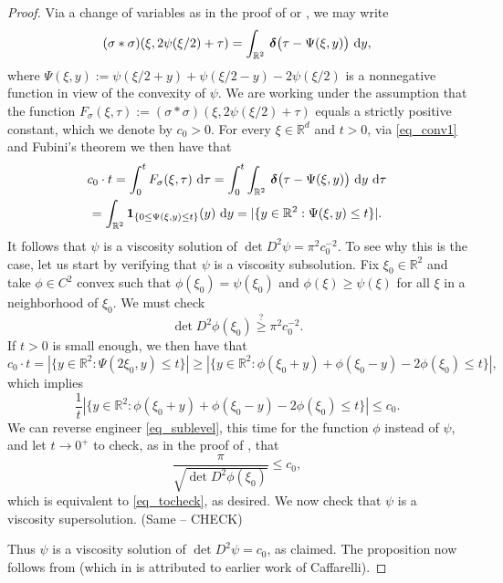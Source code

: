 \documentclass[11pt]{amsart}
\newcommand{\pvector}[1]{
  \begin{pmatrix}
    #1
  \end{pmatrix}}
\newcommand{\ddirac}[1]{
  \,\boldsymbol{\delta}\!\pvector{#1}\!}
\renewcommand{\d}{\,{\rm d}}
\def\R{\mathbb{R}}
\begin{document}
\begin{proof}
Via a change of variables as in the proof of \cite[Prop. 2.1.(c)]{OSQ18} or \cite[Prop. 2.1.(c)]{OSQ20}, we may write
\begin{equation}\label{eq_conv1}
    (\sigma\ast\sigma)(\xi,2\psi(\xi/2)+\tau)=\int_{\R^2}\ddirac{\tau-\Psi(\xi,y)}\,\d y,
\end{equation}
    where $\Psi(\xi,y):=\psi(\xi/2+y)+\psi(\xi/2-y)-2\psi(\xi/2)$ is a nonnegative function in view of the convexity of $\psi$.
    We are working under the assumption that the function $F_\sigma(\xi,\tau):=(\sigma\ast\sigma)(\xi,2\psi(\xi/2)+\tau)$ equals a strictly positive constant, which we denote by $c_0>0$. For every $\xi\in\R^d$ and $t>0$, via \eqref{eq_conv1} and Fubini's theorem we then have that
    \begin{multline}\label{eq_sublevel}
        c_0\cdot t
    =\int_0^t F_\sigma(\xi,\tau)\,\d\tau
    =\int_0^t \int_{\R^2}\ddirac{\tau-\Psi(\xi,y)}\,\d y\,\d\tau\\
    =\int_{\R^2} {\bf 1}_{\{0\leq\Psi(\xi,y)\leq t\}} (y)\,\d y=|\{y\in\R^2: \Psi(\xi,y)\leq t\}|.
    \end{multline}
    It follows that $\psi$ is a viscosity solution of $\det D^2\psi=\pi^2c_0^{-2}$.
    To see why this is the case, let us start by verifying that $\psi$ is a viscosity subsolution. 
    Fix $\xi_0\in\R^2$ and take $\phi\in C^2$ convex such that $\phi(\xi_0)=\psi(\xi_0)$ and $\phi(\xi)\geq\psi(\xi)$ for all $\xi$ in a neighborhood of $\xi_0$. 
    We must check  
    \begin{equation}\label{eq_tocheck}
        \det D^2\phi(\xi_0)\stackrel{?}{\geq} \pi^2c_0^{-2}.
    \end{equation}
    If $t>0$ is small enough, we then have that
    \[c_0\cdot t=|\{y\in\R^2: \Psi(2\xi_0,y)\leq t\}| \geq 
    |\{y\in\R^2:\phi(\xi_0+y)+\phi(\xi_0-y)-2\phi(\xi_0)\leq t\}|,\]
    which implies 
    \begin{equation}\label{eq_sublevel}
        \frac1t |\{y\in\R^2:\phi(\xi_0+y)+\phi(\xi_0-y)-2\phi(\xi_0)\leq t\}|\leq c_0.
    \end{equation}
    We can reverse engineer \eqref{eq_sublevel}, this time for the function $\phi$ instead of $\psi$, and let  $t\to 0^+$ to check, as in the proof of \cite[Prop.\@ 2.1(d)]{OSQ18},
    that
    \[\frac{\pi}{\sqrt{\det D^2\phi(\xi_0)}}\leq c_0,\]
 which is equivalent to \eqref{eq_tocheck}, as desired.
    We now check that $\psi$ is a viscosity supersolution. (Same -- CHECK)

    Thus $\psi$ is a viscosity solution of $\det D^2\psi=c_0$, as claimed. The proposition now follows from \cite[Theorem 1.1]{CL03} (which in  \cite{CL03} is attributed to earlier work of Caffarelli).
\end{proof} 
\end{document}
